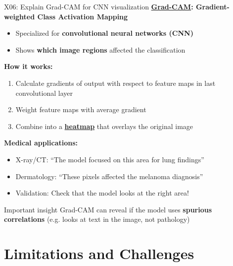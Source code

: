 \documentclass[aspectratio=169, 10pt]{beamer}
\begin{document}
\begin{frame}{X06: Explain Grad-CAM for CNN visualization}
    \textbf{\href{https://arxiv.org/abs/1610.02391}{Grad-CAM}: Gradient-weighted Class Activation Mapping}
    
    \begin{itemize}
        \item Specialized for \textbf{convolutional neural networks (CNN)}
        \item Shows \textbf{which image regions} affected the classification
    \end{itemize}
    
    \vspace{0.2cm}
    \textbf{How it works:}
    \begin{enumerate}
        \item Calculate gradients of output with respect to feature maps in last convolutional layer
        \item Weight feature maps with average gradient
        \item Combine into a \textbf{\href{https://en.wikipedia.org/wiki/Heat_map}{heatmap}} that overlays the original image
    \end{enumerate}
    
    \vspace{0.2cm}
    \textbf{Medical applications:}
    \begin{itemize}
        \item X-ray/CT: ``The model focused on this area for lung findings''
        \item Dermatology: ``These pixels affected the melanoma diagnosis''
        \item Validation: Check that the model looks at the right area!
    \end{itemize}
    
    {\footnotesize
    \begin{alertblock}{Important insight}
        Grad-CAM can reveal if the model uses \textbf{spurious correlations} (e.g. looks at text in the image, not pathology)
    \end{alertblock}
    }
\end{frame}

\section{Limitations and Challenges}
\end{document}
